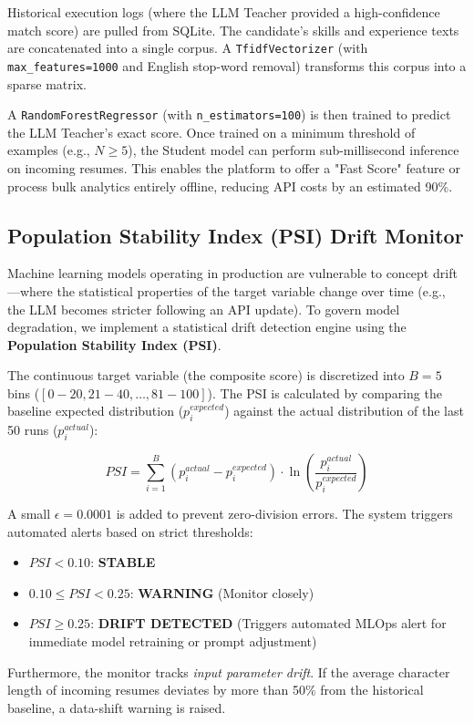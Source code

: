 Historical execution logs (where the LLM Teacher provided a high-confidence match score) are pulled from SQLite. The candidate's skills and experience texts are concatenated into a single corpus. A \texttt{TfidfVectorizer} (with \texttt{max\_features=1000} and English stop-word removal) transforms this corpus into a sparse matrix.

A \texttt{RandomForestRegressor} (with \texttt{n\_estimators=100}) is then trained to predict the LLM Teacher's exact score. Once trained on a minimum threshold of examples (e.g., $N \geq 5$), the Student model can perform sub-millisecond inference on incoming resumes. This enables the platform to offer a "Fast Score" feature or process bulk analytics entirely offline, reducing API costs by an estimated 90\%.

\subsection{Population Stability Index (PSI) Drift Monitor}
Machine learning models operating in production are vulnerable to concept drift—where the statistical properties of the target variable change over time (e.g., the LLM becomes stricter following an API update). To govern model degradation, we implement a statistical drift detection engine using the \textbf{Population Stability Index (PSI)}.

The continuous target variable (the composite score) is discretized into $B=5$ bins ($[0-20, 21-40, \dots, 81-100]$). The PSI is calculated by comparing the baseline expected distribution ($p_i^{expected}$) against the actual distribution of the last 50 runs ($p_i^{actual}$):

\begin{equation}
    PSI = \sum_{i=1}^{B} \left(p_i^{actual} - p_i^{expected}\right) \cdot \ln\left(\frac{p_i^{actual}}{p_i^{expected}}\right)
\end{equation}

A small $\epsilon = 0.0001$ is added to prevent zero-division errors. The system triggers automated alerts based on strict thresholds:
\begin{itemize}
    \item $PSI < 0.10$: \textbf{STABLE}
    \item $0.10 \leq PSI < 0.25$: \textbf{WARNING} (Monitor closely)
    \item $PSI \geq 0.25$: \textbf{DRIFT DETECTED} (Triggers automated MLOps alert for immediate model retraining or prompt adjustment)
\end{itemize}
Furthermore, the monitor tracks \textit{input parameter drift}. If the average character length of incoming resumes deviates by more than 50\% from the historical baseline, a data-shift warning is raised.
